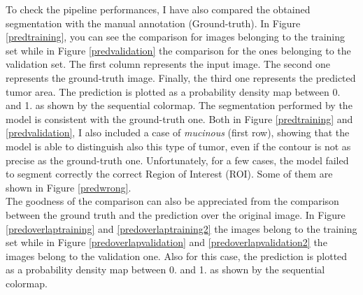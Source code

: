 \documentclass{standalone}
\begin{document}
To check the pipeline performances, I have also compared the obtained segmentation with the manual annotation (Ground-truth).
In Figure \ref{predtraining}, you can see the comparison for images belonging to the training set while in Figure \ref{predvalidation} the comparison for the ones belonging to the validation set.
The first column represents the input image. 
The second one represents the ground-truth image. 
Finally, the third one represents the predicted tumor area.
The prediction is plotted as a probability density map between 0. and 1. as shown by the sequential colormap.
The segmentation performed by the model is consistent with the ground-truth one.
Both in Figure \ref{predtraining} and \ref{predvalidation}, I also included a case of \textit{mucinous} (first row), showing that the model is able to distinguish also this type of tumor, even if the contour is not as precise as the ground-truth one.
Unfortunately, for a few cases, the model failed to segment correctly the correct Region of Interest (ROI).
Some of them are shown in Figure \ref{predwrong}.\\
The goodness of the comparison can also be appreciated from the comparison between the ground truth and the prediction over the original image.
In Figure \ref{predoverlaptraining} and \ref{predoverlaptraining2} the images belong to the training set while in Figure \ref{predoverlapvalidation} and \ref{predoverlapvalidation2} the images belong to the validation one.
Also for this case, the prediction is plotted as a probability density map between 0. and 1. as shown by the sequential colormap.
\end{document}
